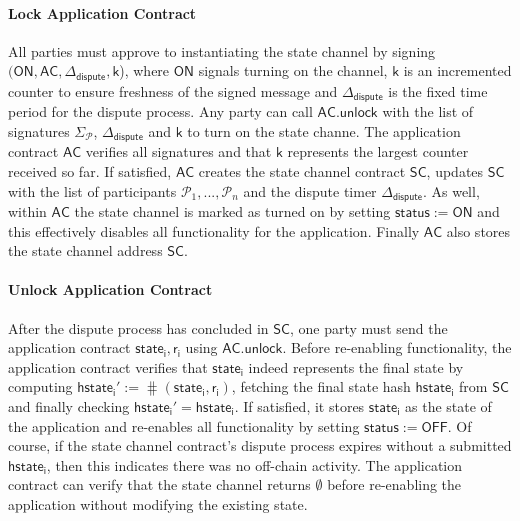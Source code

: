 \documentclass{llncs}
\newcommand{\chanstatus}{\mathsf{status}}
\newcommand{\chanon}{\mathsf{ON}}
\newcommand{\chanoff}{\mathsf{OFF}}
\newcommand{\hstatei}{\mathsf{hstate}_{\monotoniccounter}}
\newcommand{\monotoniccounter}{\mathsf{i}}
\newcommand{\stateinfoi}{\mathsf{state}_{\mathsf{i}}}
\newcommand{\participant}{\mathcal{P}}
\newcommand{\rani}{\mathsf{r}_{\mathsf{i}}}
\newcommand{\statechannel}{\mathsf{SC}}
\newcommand{\appcontract}{\mathsf{AC}}
\newcommand{\appunlock}{\mathsf{AC.unlock}}
\newcommand{\timerdispute}{\mathsf{\Delta}_{\mathsf{dispute}}}
\begin{document}


 
\paragraph{Lock Application Contract} All parties must approve to instantiating the state channel by signing $(\chanon, \appcontract, \timerdispute, \mathsf{k}$), where $\chanon$ signals turning on the channel, $\mathsf{k}$ is an incremented counter to ensure freshness of the signed message and $\timerdispute$ is the fixed time period for the dispute process. 
Any party can call $\appunlock$ with the list of signatures $\Sigma_{\participant}$, $\timerdispute$ and $\mathsf{k}$ to turn on the state channe. 
The application contract $\appcontract$ verifies all signatures and that $\mathsf{k}$ represents the largest counter received so far.
If satisfied,  $\appcontract$ creates the state channel contract $\statechannel$, updates $\statechannel$ with the list of participants $\participant_{1},...,\participant_{n}$ and the dispute timer $\timerdispute$. 
As well, within $\appcontract$ the state channel is marked as turned on by setting $\chanstatus := \chanon$ and this effectively disables all functionality for the application.
Finally $\appcontract$ also stores the state channel address $\statechannel$. 
 

\paragraph{Unlock Application Contract}

After the dispute process has concluded in $\statechannel$, one party must send the application contract  $\stateinfoi,\rani$ using $\appunlock$. 
Before re-enabling functionality, the application contract verifies that $\stateinfoi$  indeed represents the final state by computing $\hstatei' := \hash(\stateinfoi, \rani)$, fetching the final state hash $\hstatei$ from $\statechannel$ and finally checking  $\hstatei' = \hstatei$. 
If satisfied, it stores $\stateinfoi$ as the  state of the application and re-enables all functionality by setting $\chanstatus := \chanoff$. 
Of course, if the state channel contract's dispute process expires without a submitted $\hstatei$, then this indicates there was no off-chain activity.
The application contract can verify that the state channel returns $\emptyset$ before re-enabling the application without modifying the existing state. 
\end{document}
